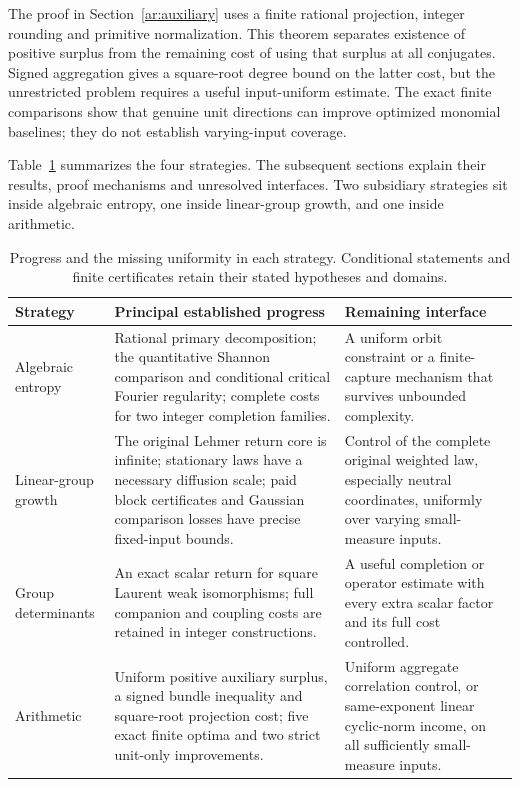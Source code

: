 The proof in Section~\ref{ar:auxiliary} uses a finite rational projection, integer rounding and primitive normalization.
This theorem separates existence of positive surplus from the remaining cost of using that surplus at all conjugates.
Signed aggregation gives a square-root degree bound on the latter cost, but the unrestricted problem requires a useful input-uniform estimate.
The exact finite comparisons show that genuine unit directions can improve optimized monomial baselines; they do not establish varying-input coverage.

Table~\ref{ov:routes} summarizes the four strategies.
The subsequent sections explain their results, proof mechanisms and unresolved interfaces.
Two subsidiary strategies sit inside algebraic entropy, one inside linear-group growth, and one inside arithmetic.

\begin{table}[htbp]
\centering\small
\begin{tabular}{@{}>{\raggedright\arraybackslash}p{}
 >{\raggedright\arraybackslash}p{}
 >{\raggedright\arraybackslash}p{}@{}}
\toprule
Strategy & Principal established progress & Remaining interface\\
\midrule
Algebraic entropy
& Rational primary decomposition; the quantitative Shannon comparison
and conditional critical Fourier regularity; complete costs for two
integer completion families.
& A uniform orbit constraint or a finite-capture mechanism that survives
unbounded complexity.\\[5pt]
Linear-group growth
& The original Lehmer return core is infinite; stationary laws have a
necessary diffusion scale; paid block certificates and Gaussian
comparison losses have precise fixed-input bounds.
& Control of the complete original weighted law, especially neutral
coordinates, uniformly over varying small-measure inputs.\\[5pt]
Group determinants
& An exact scalar return for square Laurent weak isomorphisms; full
companion and coupling costs are retained in integer constructions.
& A useful completion or operator estimate with every extra scalar
factor and its full cost controlled.\\[5pt]
Arithmetic
& Uniform positive auxiliary surplus, a signed bundle inequality and
square-root projection cost; five exact finite optima and two strict
unit-only improvements.
& Uniform aggregate correlation control, or same-exponent linear
cyclic-norm income, on all sufficiently small-measure inputs.\\
\bottomrule
\end{tabular}
\caption{Progress and the missing uniformity in each strategy.
Conditional statements and finite certificates retain their stated hypotheses and domains.}
\label{ov:routes}
\end{table}

